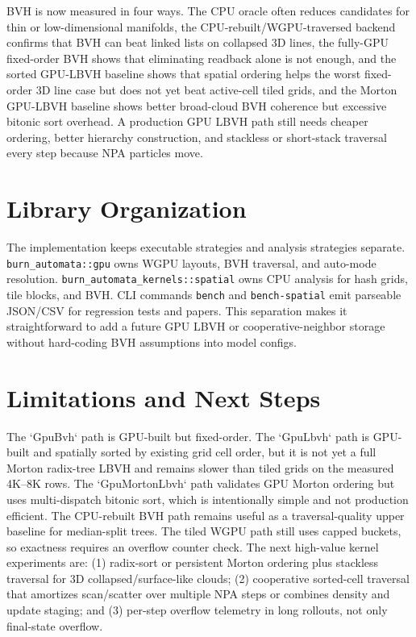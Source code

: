 \documentclass[10pt,twocolumn]{article}
\begin{document}
BVH is now measured in four ways. The CPU oracle often reduces candidates for
thin or low-dimensional manifolds, the CPU-rebuilt/WGPU-traversed backend
confirms that BVH can beat linked lists on collapsed 3D lines, the fully-GPU
fixed-order BVH shows that eliminating readback alone is not enough, and the
sorted GPU-LBVH baseline shows that spatial ordering helps the worst fixed-order
3D line case but does not yet beat active-cell tiled grids, and the Morton
GPU-LBVH baseline shows better broad-cloud BVH coherence but excessive bitonic
sort overhead. A production GPU LBVH path still needs cheaper ordering, better
hierarchy construction, and stackless or short-stack traversal every step
because NPA particles move.

\section{Library Organization}
The implementation keeps executable strategies and analysis strategies separate.
\texttt{burn\_automata::gpu} owns WGPU layouts, BVH traversal, and auto-mode resolution.
\texttt{burn\_automata\_kernels::spatial} owns CPU analysis for hash grids,
tile blocks, and BVH. CLI commands \texttt{bench} and \texttt{bench-spatial}
emit parseable JSON/CSV for regression tests and papers. This separation makes
it straightforward to add a future GPU LBVH or cooperative-neighbor storage
without hard-coding BVH assumptions into model configs.

\section{Limitations and Next Steps}
The `GpuBvh` path is GPU-built but fixed-order. The `GpuLbvh` path is
GPU-built and spatially sorted by existing grid cell order, but it is not yet a
full Morton radix-tree LBVH and remains slower than tiled grids on the measured
4K--8K rows. The `GpuMortonLbvh` path validates GPU Morton ordering but uses
multi-dispatch bitonic sort, which is intentionally simple and not production
efficient. The CPU-rebuilt BVH path remains useful as a traversal-quality upper
baseline for median-split trees. The tiled WGPU path still uses capped buckets,
so exactness requires an overflow counter check. The next high-value kernel
experiments are: (1) radix-sort or persistent Morton ordering plus stackless
traversal for 3D collapsed/surface-like clouds; (2)
cooperative sorted-cell traversal that amortizes scan/scatter over multiple NPA
steps or combines density and update staging; and (3) per-step overflow
telemetry in long rollouts, not only final-state overflow.
\end{document}
